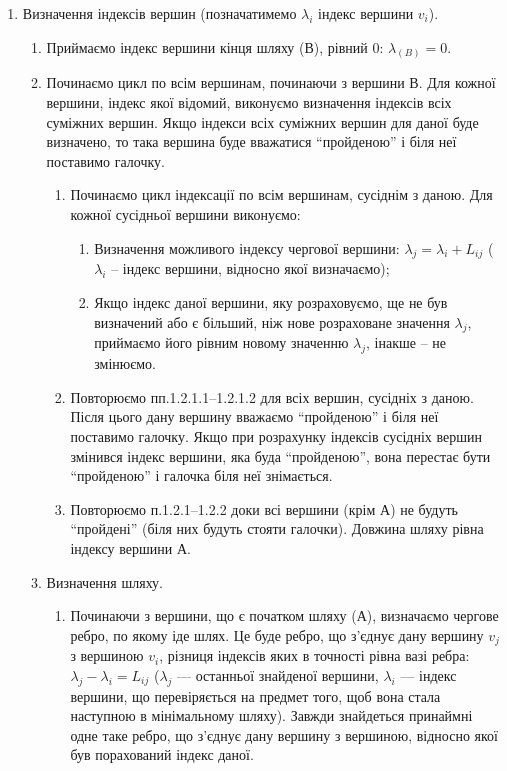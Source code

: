 \begin{enumerate}

\item Визначення індексів вершин (позначатимемо $\lambda_{i}$ індекс вершини $v_{i}$).
\begin{enumerate}
\item Приймаємо індекс вершини кінця шляху ($В$), рівний 0: $\lambda_{(B)} = 0$.

\item Починаємо цикл по всім вершинам, починаючи з вершини $В$. Для кожної вершини, індекс якої
  відомий, виконуємо визначення індексів всіх суміжних вершин. Якщо індекси всіх суміжних вершин для
  даної буде визначено, то така вершина буде вважатися ``пройденою'' і біля неї поставимо галочку.
\begin{enumerate}
\item Починаємо цикл індексації по всім вершинам, сусіднім з даною. Для кожної сусідньої вершини
виконуємо:

  \begin{enumerate}
  \item Визначення можливого індексу чергової вершини: $\lambda_{j} = \lambda_{i} + L_{ij}$
    ($\lambda_{i}$ -- індекс вершини, відносно якої визначаємо);

  \item Якщо індекс даної вершини, яку розраховуємо, ще не був визначений або є більший, ніж нове
    розраховане значення $\lambda_{j}$, приймаємо його рівним новому значенню $\lambda_{j}$, інакше
    -- не змінюємо.
  \end{enumerate}
\item Повторюємо пп.1.2.1.1--1.2.1.2 для всіх вершин, сусідніх з даною.  Після цього дану вершину
  вважаємо ``пройденою'' і біля неї поставимо галочку. Якщо при розрахунку індексів сусідніх вершин
  змінився індекс вершини, яка буда ``пройденою'', вона перестає бути ``пройденою'' і галочка біля
  неї знімається.

\item Повторюємо п.1.2.1--1.2.2 доки всі вершини (крім $А$) не будуть ``пройдені'' (біля них будуть
  стояти галочки). Довжина шляху рівна індексу вершини $А$.
\end{enumerate}
\item Визначення шляху.

\begin{enumerate}
\item Починаючи з вершини, що є початком шляху ($А$), визначаємо чергове ребро, по якому іде
  шлях. Це буде ребро, що з'єднує дану вершину $v_{j}$ з вершиною $v_i$, різниця індексів яких в
  точності рівна вазі ребра: $\lambda_{j} - \lambda_{i} = L_{ij}$ ($\lambda_{j}$ --- останньої
  знайденої вершини, $\lambda_{i}$ --- індекс вершини, що перевіряється на предмет того, щоб вона
  стала наступною в мінімальному шляху). Завжди знайдеться принаймні одне таке ребро, що з'єднує
  дану вершину з вершиною, відносно якої був порахований індекс даної.


\end{enumerate}
\end{enumerate}
\end{enumerate}
